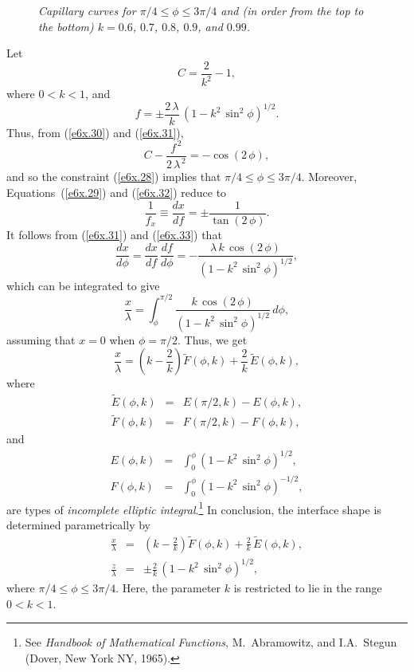 \begin{figure}
\epsfysize=3.5in
\centerline{}
\caption{\em Capillary curves for $\pi/4\leq \phi\leq 3\pi/4$ and  (in order from the top to the bottom) $k=0.6$, $0.7$, $0.8$, $0.9$, and $0.99$.}\label{f6x.04}
\end{figure}

 Let
\begin{equation}\label{e6x.30}
C = \frac{2}{k^2}-1,
\end{equation}
where $0< k< 1$, and
\begin{equation}\label{e6x.31}
f = \pm\frac{2\,\lambda}{k}\,(1-k^2\,\sin^2\phi)^{1/2}.
\end{equation}
Thus, from (\ref{e6x.30}) and (\ref{e6x.31}), 
\begin{equation}\label{e6x.32}
C - \frac{f^{\,2}}{2\,\lambda^{\,2}} =-\cos(2\,\phi),
\end{equation}
and so the constraint (\ref{e6x.28}) implies that $\pi/4\leq \phi\leq 3\pi/4$. Moreover, Equations~(\ref{e6x.29})
and (\ref{e6x.32})
reduce to
\begin{equation}\label{e6x.33}
\frac{1}{f_x}\equiv \frac{dx}{df} = \pm \frac{1}{\tan(2\,\phi)}.
\end{equation}
It follows from (\ref{e6x.31}) and (\ref{e6x.33}) that
\begin{equation}
\frac{dx}{d\phi} = \frac{dx}{df}\,\frac{df}{d\phi} = -\frac{\lambda\,k\,\cos(2\,\phi)}{(1-k^2\,\sin^2\phi)^{1/2}},
\end{equation}
which can be integrated to give
\begin{equation}
\frac{x}{\lambda} = \int_\phi^{\pi/2} \frac{k\,\cos(2\,\phi)}{(1-k^2\,\sin^2\phi)^{1/2}}\,d\phi,
\end{equation}
assuming that $x=0$ when $\phi=\pi/2$. 
Thus, we get
\begin{equation}
\frac{x}{\lambda} = \left(k-\frac{2}{k}\right)\tilde{F}(\phi,k) + \frac{2}{k}\,\tilde{E}(\phi,k),
\end{equation}
where
\begin{eqnarray}
\tilde{E}(\phi,k) &=& E(\pi/2,k)- E(\phi,k),\\[0.5ex]
\tilde{F}(\phi,k) &=&  F(\pi/2,k)- F(\phi,k),
\end{eqnarray}
and
\begin{eqnarray}
E(\phi,k) &=& \int_0^\phi (1-k^2\,\sin^2\phi)^{1/2},\label{e8x56}\\[0.5ex]
F(\phi,k) &=& \int_0^\phi (1-k^2\,\sin^2\phi)^{-1/2},\label{e8x57}
\end{eqnarray}
are types of {\em incomplete elliptic integral}.\footnote{See {\em Handbook of Mathematical Functions}, M.~Abramowitz, and
I.A.~Stegun (Dover, New York NY, 1965).}  In conclusion, the  interface shape is  determined parametrically by 
\begin{eqnarray}\label{e6x.38}
\frac{x}{\lambda}& =& \left(k-\frac{2}{k}\right)\tilde{F}(\phi,k) + \frac{2}{k}\,\tilde{E}(\phi,k),\\[0.5ex]
\frac{z}{\lambda} &=& \pm\frac{2}{k}\,(1-k^2\,\sin^2\phi)^{1/2},\label{e6x.39}
\end{eqnarray}
where  $\pi/4\leq \phi\leq 3\pi/4$. Here, the parameter $k$ is restricted to lie in the range $0< k< 1$. 

